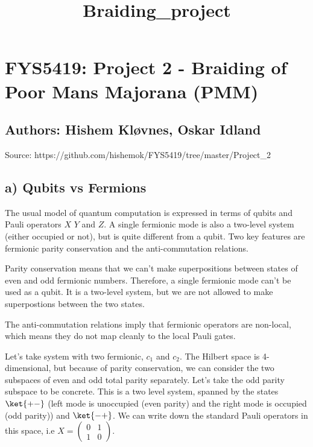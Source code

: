 \documentclass[11pt,landscape]{article}
\title{Braiding\_project}
\begin{document}
    
    \maketitle
    
    

    
    \section{FYS5419: Project 2 - Braiding of Poor Mans Majorana
(PMM)}\label{fys5419-project-2---braiding-of-poor-mans-majorana-pmm}

\subsection{Authors: Hishem Kløvnes, Oskar
Idland}\label{authors-hishem-kluxf8vnes-oskar-idland}

Source: https://github.com/hishemok/FYS5419/tree/master/Project\_2

    \subsection{a) Qubits vs Fermions}\label{a-qubits-vs-fermions}

The usual model of quantum computation is expressed in terms of qubits
and Pauli operators \(X\) \(Y\) and \(Z\). A single fermionic mode is
also a two-level system (either occupied or not), but is quite different
from a qubit. Two key features are fermionic parity conservation and the
anti-commutation relations.

Parity conservation means that we can't make superpositions between
states of even and odd fermionic numbers. Therefore, a single fermionic
mode can't be used as a qubit. It is a two-level system, but we are not
allowed to make superpostions between the two states.

The anti-commutation relations imply that fermionic operators are
non-local, which means they do not map cleanly to the local Pauli gates.

Let's take system with two fermionic, \(c_1\) and \(c_2\). The Hilbert
space is 4-dimensional, but because of parity conservation, we can
consider the two subspaces of even and odd total parity separately.
Let's take the odd parity subspace to be concrete. This is a two level
system, spanned by the states \(\ket{+ -}\) (left mode is unoccupied
(even parity) and the right mode is occupied (odd parity)) and
\(\ket{ - +}\). We can write down the standard Pauli operators in this
space, i.e \(X = \begin{pmatrix} 0 &1\\1&0 \end{pmatrix}\).
\end{document}

